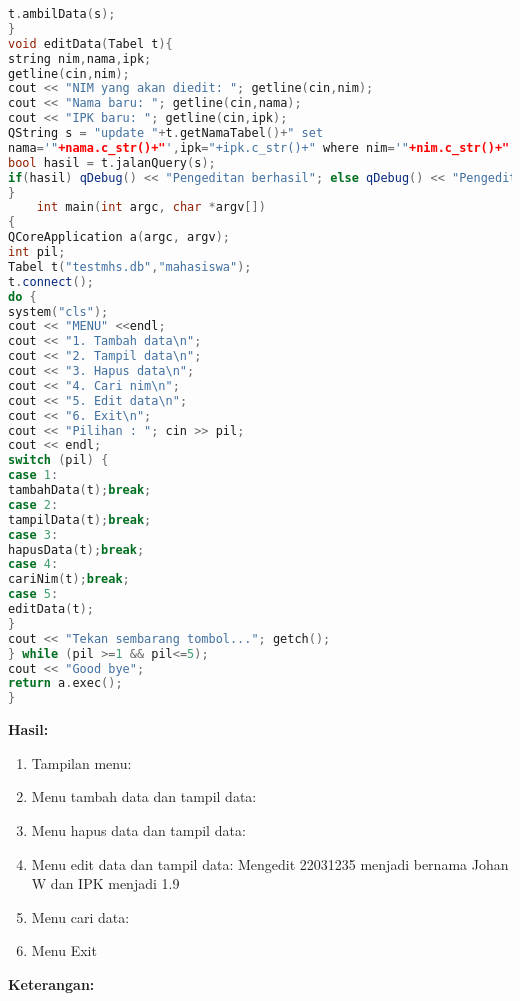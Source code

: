 \begin{enumerate}
\begin{lstlisting}[language=c++, caption= Pembuatan manipulasi data pada SQLite dengan menggunakan menu]
t.ambilData(s);
}
void editData(Tabel t){
string nim,nama,ipk;
getline(cin,nim);
cout << "NIM yang akan diedit: "; getline(cin,nim);
cout << "Nama baru: "; getline(cin,nama);
cout << "IPK baru: "; getline(cin,ipk);
QString s = "update "+t.getNamaTabel()+" set
nama='"+nama.c_str()+"',ipk="+ipk.c_str()+" where nim='"+nim.c_str()+"'";
bool hasil = t.jalanQuery(s);
if(hasil) qDebug() << "Pengeditan berhasil"; else qDebug() << "Pengeditan gagal";
}
    int main(int argc, char *argv[])
{
QCoreApplication a(argc, argv);
int pil;
Tabel t("testmhs.db","mahasiswa");
t.connect();
do {
system("cls");
cout << "MENU" <<endl;
cout << "1. Tambah data\n";
cout << "2. Tampil data\n";
cout << "3. Hapus data\n";
cout << "4. Cari nim\n";
cout << "5. Edit data\n";
cout << "6. Exit\n";
cout << "Pilihan : "; cin >> pil;
cout << endl;
switch (pil) {
case 1:
tambahData(t);break;
case 2:
tampilData(t);break;
case 3:
hapusData(t);break;
case 4:
cariNim(t);break;
case 5:
editData(t);
}
cout << "Tekan sembarang tombol..."; getch();
} while (pil >=1 && pil<=5);
cout << "Good bye";
return a.exec();
}
\end{lstlisting}
\end{enumerate}

\textbf{Hasil:}

\begin{enumerate}

\item
  Tampilan menu:
\item
  Menu tambah data dan tampil data:
\item
  Menu hapus data dan tampil data:
\item
  Menu edit data dan tampil data: Mengedit 22031235 menjadi bernama
  Johan W dan IPK menjadi 1.9
\item
  Menu cari data:
\item
  Menu Exit
\end{enumerate}

\textbf{Keterangan:}

